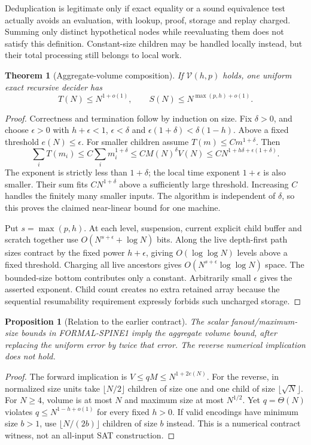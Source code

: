 \documentclass[11pt]{article}
\newtheorem{theorem}{Theorem}
\newtheorem{proposition}{Proposition}
\begin{document}
Deduplication is legitimate only if exact equality or a sound equivalence
test actually avoids an evaluation, with lookup, proof, storage and replay
charged. Summing only distinct hypothetical nodes while reevaluating them
does not satisfy this definition. Constant-size children may be handled
locally instead, but their total processing still belongs to local work.

\begin{theorem}[Aggregate-volume composition]
If $\mathcal V(h,p)$ holds, one uniform exact recursive decider has
\[
 T(N)\le N^{1+o(1)},\qquad
 S(N)\le N^{\max(p,h)+o(1)}.
\]
\end{theorem}
\begin{proof}
Correctness and termination follow by induction on size. Fix $\delta>0$,
and choose $\epsilon>0$ with $h+\epsilon<1$, $\epsilon<\delta$ and
$\epsilon(1+\delta)<\delta(1-h)$. Above a fixed threshold $e(N)\le\epsilon$.
For smaller children assume $T(m)\le C m^{1+\delta}$. Then
\[
 \sum_iT(m_i)\le C\sum_i m_i^{1+\delta}
 \le C M(N)^\delta V(N)
 \le C N^{1+h\delta+\epsilon(1+\delta)}.
\]
The exponent is strictly less than $1+\delta$; the local time exponent
$1+\epsilon$ is also smaller. Their sum fits $C N^{1+\delta}$ above a
sufficiently large threshold. Increasing $C$ handles the finitely many
smaller inputs. The algorithm is independent of $\delta$, so this proves
the claimed near-linear bound for one machine.

Put $s=\max(p,h)$. At each level, suspension, current explicit child
buffer and scratch together use $O(N^{s+\epsilon}+\log N)$ bits. Along
the live depth-first path sizes contract by the fixed power $h+\epsilon$,
giving $O(\log\log N)$ levels above a fixed threshold. Charging all live
ancestors gives $O(N^{s+\epsilon}\log\log N)$ space. The bounded-size
bottom contributes only a constant. Arbitrarily small $\epsilon$ gives
the asserted exponent. Child count creates no extra retained array because
the sequential resumability requirement expressly forbids such uncharged
storage.
\end{proof}

\begin{proposition}[Relation to the earlier contract]
The scalar fanout/maximum-size bounds in FORMAL-SPINE1 imply the aggregate
volume bound, after replacing the uniform error by twice that error.
The reverse numerical implication does not hold.
\end{proposition}
\begin{proof}
The forward implication is $V\le qM\le N^{1+2e(N)}$.
For the reverse, in normalized size units take $\lfloor N/2\rfloor$
children of size one and one child of size $\lfloor\sqrt N\rfloor$.
For $N\ge4$, volume is at most $N$ and maximum size at most $N^{1/2}$.
Yet $q=\Theta(N)$ violates $q\le N^{1-h+o(1)}$ for every fixed $h>0$.
If valid encodings have minimum size $b>1$, use
$\lfloor N/(2b)\rfloor$ children of size $b$ instead. This is a numerical
contract witness, not an all-input SAT construction.
\end{proof}
\end{document}
